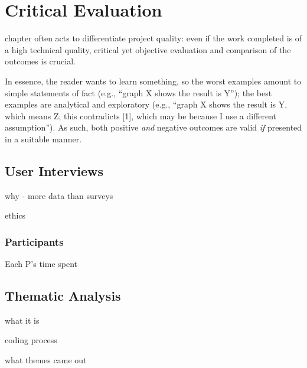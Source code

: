 \chapter{Critical Evaluation}
\label{chap:evaluation}




\This chapter often acts to differentiate project quality:
even if the work completed is of a high technical quality, critical yet objective evaluation and comparison of the outcomes is crucial.

In essence, the reader wants to learn something,
so the worst examples amount to simple statements of fact
(e.g., ``graph X shows the result is Y'');
the best examples are analytical  and exploratory
(e.g., ``graph X shows the result is Y, which means Z; this contradicts [1], which may be because I use a different assumption'').
As such, both positive {\em and} negative outcomes are valid
{\em if} presented  in a suitable manner.







\section{User Interviews}
why - more data than surveys

ethics

\subsection{Participants}
Each P's time spent


\section{Thematic Analysis}
what it is

coding process

what themes came out


